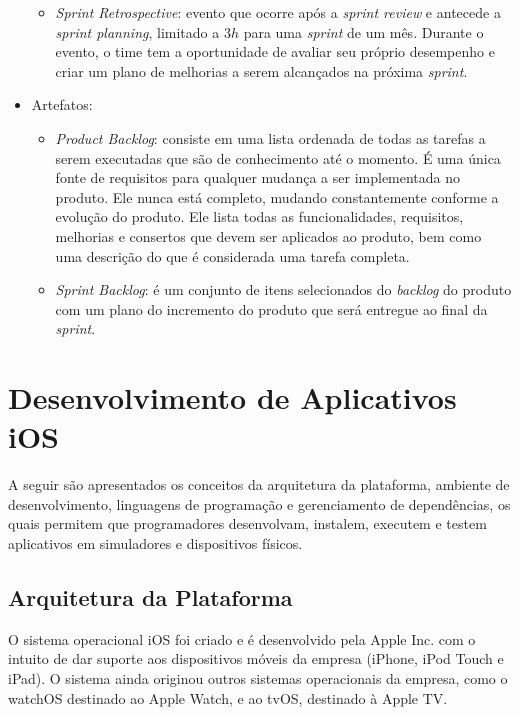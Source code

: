 \begin{itemize}
\begin{itemize}
        \item \textit{Sprint Retrospective}: evento que ocorre após a \textit{sprint review} e antecede a \textit{sprint planning}, limitado a $3h$ para uma \textit{sprint} de um mês. Durante o evento, o time tem a oportunidade de avaliar seu próprio desempenho e criar um plano de melhorias a serem alcançados na próxima \textit{sprint}.
    \end{itemize}
    \item Artefatos:
    \begin{itemize}
        \item \textit{Product Backlog}: consiste em uma lista ordenada de todas as tarefas a serem executadas que são de conhecimento até o momento. É uma única fonte de requisitos para qualquer mudança a ser implementada no produto. Ele nunca está completo, mudando constantemente conforme a evolução do produto. Ele lista todas as funcionalidades, requisitos, melhorias e consertos que devem ser aplicados ao produto, bem como uma descrição do que é considerada uma tarefa completa.
        \item \textit{Sprint Backlog}: é um conjunto de itens selecionados do \textit{backlog} do produto com um plano do incremento do produto que será entregue ao final da \textit{sprint}.
    \end{itemize}
\end{itemize}

\section{Desenvolvimento de Aplicativos iOS}
A seguir são apresentados os conceitos da arquitetura da plataforma, ambiente de desenvolvimento, linguagens de programação e gerenciamento de dependências, os quais permitem que programadores desenvolvam, instalem, executem e testem aplicativos em simuladores e dispositivos físicos.

\subsection{Arquitetura da Plataforma}
O sistema operacional iOS foi criado e é desenvolvido pela Apple Inc. com o intuito de dar suporte aos dispositivos móveis da empresa (iPhone, iPod Touch e iPad). O sistema ainda originou
outros sistemas operacionais da empresa, como o watchOS destinado ao Apple Watch, e ao tvOS, destinado à Apple TV. 


